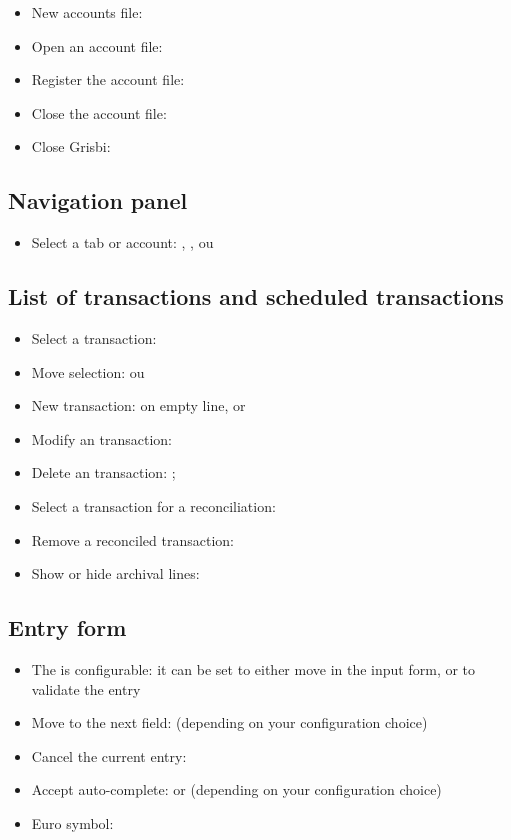 \begin{itemize}
	\item New accounts file: 
	\item Open an account file: 
	\item Register the account file: 
	\item Close the account file: 
	\item Close Grisbi: 
\end{itemize}


\subsection{Navigation panel}

\begin{itemize}
	\item Select a tab or account: , ,  ou 
\end{itemize}

\subsection{List of transactions and scheduled transactions}

\begin{itemize}
	\item Select a transaction: 
	\item Move selection: ou 
	\item New transaction:   on empty line, or 
	\item Modify an transaction: 
	\item Delete an transaction: ;
	\item Select a transaction for a reconciliation:
	\item Remove a reconciled transaction: 
	\item Show or hide archival lines: 
\end{itemize}


\subsection{Entry form}

\begin{itemize}
	\item The  is configurable: it can be set to either move in the input form, or to validate the entry
	\item Move to the next field:  (depending on your configuration choice)
	\item Cancel the current entry: 
	\item Accept auto-complete:  or  (depending on your configuration choice)
	\item  Euro symbol: 
\end{itemize}

